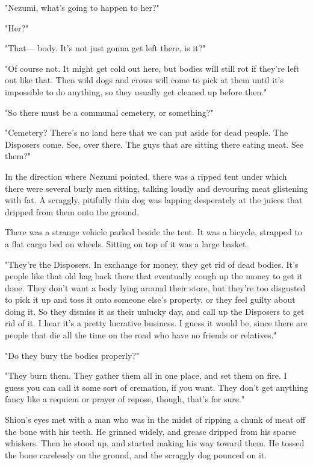 "Nezumi, what's going to happen to her?"

"Her?"

"That--- body. It's not just gonna get left there, is it?"

"Of course not. It might get cold out here, but bodies will still rot if
they're left out like that. Then wild dogs and crows will come to pick
at them until it's impossible to do anything, so they usually get
cleaned up before then."

"So there must be a communal cemetery, or something?"

"Cemetery? There's no land here that we can put aside for dead people.
The Disposers come. See, over there. The guys that are sitting there
eating meat. See them?"

In the direction where Nezumi pointed, there was a ripped tent under
which there were several burly men sitting, talking loudly and devouring
meat glistening with fat. A scraggly, pitifully thin dog was lapping
desperately at the juices that dripped from them onto the ground.

There was a strange vehicle parked beside the tent. It was a bicycle,
strapped to a flat cargo bed on wheels. Sitting on top of it was a large
basket.

"They're the Disposers. In exchange for money, they get rid of dead
bodies. It's people like that old hag back there that eventually cough
up the money to get it done. They don't want a body lying around their
store, but they're too disgusted to pick it up and toss it onto someone
else's property, or they feel guilty about doing it. So they dismiss it
as their unlucky day, and call up the Disposers to get rid of it. I hear
it's a pretty lucrative business. I guess it would be, since there are
people that die all the time on the road who have no friends or
relatives."

"Do they bury the bodies properly?"

"They burn them. They gather them all in one place, and set them on
fire. I guess you can call it some sort of cremation, if you want. They
don't get anything fancy like a requiem or prayer of repose, though,
that's for sure."

Shion's eyes met with a man who was in the midst of ripping a chunk of
meat off the bone with his teeth. He grinned widely, and grease dripped
from his sparse whiskers. Then he stood up, and started making his way
toward them. He tossed the bone carelessly on the ground, and the
scraggly dog pounced on it.

